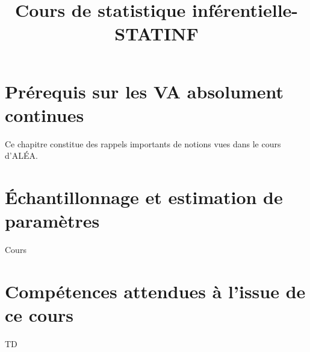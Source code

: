 \documentclass[fleqn,a4paper,11pt]{book}
\title{Cours de statistique inférentielle- STATINF}
\begin{document}
\maketitle
\tableofcontents
\newpage

\chapter{Prérequis sur les VA absolument continues}
Ce chapitre constitue des rappels importants de notions vues dans le cours d'AL\'EA.






\chapter{\'Echantillonnage et estimation de paramètres}

{Cours}
\newpage

\appendix
\chapter{Compétences attendues à l'issue de ce cours}

{TD}
\end{document}
